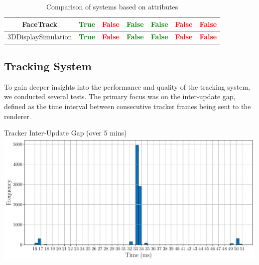 \begin{table}[h!]
{\begin{tabular}{|c|c|c|c|c|c|c|}
        \hline 
        FaceTrack \cite{10.1109/3DUI.2008.4476617} & \textbf{\textcolor{Green}{True}} & \textbf{\textcolor{red}{False}} & \textbf{\textcolor{Green}{False}} & \textbf{\textcolor{Green}{False}} & \textbf{\textcolor{red}{False}} & \textbf{\textcolor{red}{False}} \\
        \hline
        3DDisplaySimulation \cite{Zabarauskas2012} & \textbf{\textcolor{Green}{True}} & \textbf{\textcolor{red}{False}} & \textbf{\textcolor{Green}{False}} & \textbf{\textcolor{Green}{False}} & \textbf{\textcolor{red}{False}} & \textbf{\textcolor{red}{False}} \\
        \hline
    \end{tabular}}
    \caption{Comparison of systems based on attributes}
    \label{table:comparison}
\end{table}

\subsection{Tracking System}

To gain deeper insights into the performance and quality of the tracking system, we conducted several tests. The primary focus was on the inter-update gap, defined as the time interval between consecutive tracker frames being sent to the renderer.

\begin{figureBox}[label={fig:framerate-overall}, width=1.0\linewidth]{Tracker Inter-Update Gap (over 5 mins)}
    \includegraphics[width = 1.0\linewidth]{./evaluation/figures/framerate-overall.pdf}
\end{figureBox}

